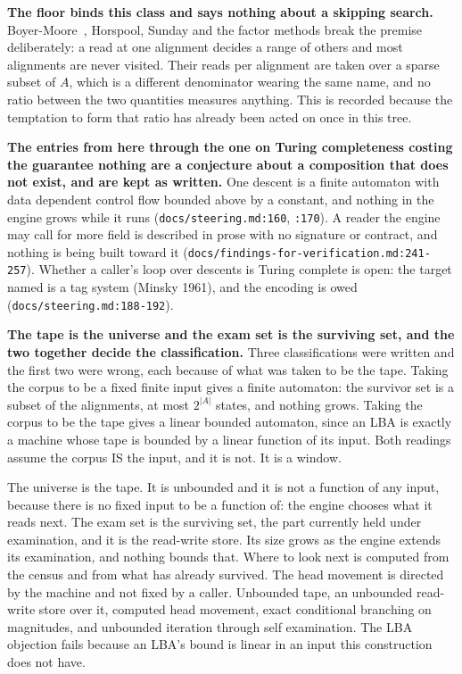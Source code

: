 \textbf{The floor binds this class and says nothing about a skipping search.} Boyer-Moore~\cite{src:Boyer-and-Moore-1977}, Horspool, Sunday and the factor methods break the premise deliberately: a read at one alignment decides a range of others and most alignments are never visited. Their reads per alignment are taken over a sparse subset of \(A\), which is a different denominator wearing the same name, and no ratio between the two quantities measures anything. This is recorded because the temptation to form that ratio has already been acted on once in this tree.

\textbf{The entries from here through the one on Turing completeness costing the guarantee nothing are a conjecture about a composition that does not exist, and are kept as written.} One descent is a finite automaton with data dependent control flow bounded above by a constant, and nothing in the engine grows while it runs (\texttt{docs/\allowbreak{}steering.md:160}, \texttt{:170}). A reader the engine may call for more field is described in prose with no signature or contract, and nothing is being built toward it (\texttt{docs/\allowbreak{}findings-\allowbreak{}for-\allowbreak{}verification.md:241-257}). Whether a caller's loop over descents is Turing complete is open: the target named is a tag system (Minsky 1961), and the encoding is owed (\texttt{docs/\allowbreak{}steering.md:188-192}).

\textbf{The tape is the universe and the exam set is the surviving set, and the two together decide the classification.} Three classifications were written and the first two were wrong, each because of what was taken to be the tape. Taking the corpus to be a fixed finite input gives a finite automaton: the survivor set is a subset of the alignments, at most \(2^{|A|}\) states, and nothing grows. Taking the corpus to be the tape gives a linear bounded automaton, since an LBA is exactly a machine whose tape is bounded by a linear function of its input. Both readings assume the corpus IS the input, and it is not. It is a window.

The universe is the tape. It is unbounded and it is not a function of any input, because there is no fixed input to be a function of: the engine chooses what it reads next. The exam set is the surviving set, the part currently held under examination, and it is the read-write store. Its size grows as the engine extends its examination, and nothing bounds that. Where to look next is computed from the census and from what has already survived. The head movement is directed by the machine and not fixed by a caller. Unbounded tape, an unbounded read-write store over it, computed head movement, exact conditional branching on magnitudes, and unbounded iteration through self examination. The LBA objection fails because an LBA's bound is linear in an input this construction does not have.

